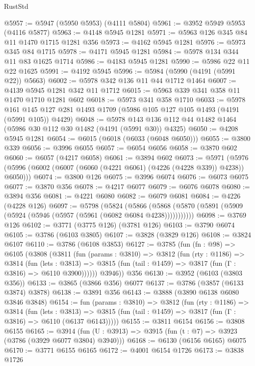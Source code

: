 \begin{lexlean}{RustStd}
\begin{coremodule}
@5957 := @5947 (@5950 @5953) (@4111 @5804)
@5961 := @3952 @5949 @5953 (@4116 @5877)
@5963 := @4148 @5945 @1281
@5971 := @5963 @126 @345 @84 @11 @1470 @1715 @1281 @356
@5973 := @4162 @5945 @1281
@5976 := @5973 @345 @84 @1715
@5978 := @4171 @5945 @1281
@5984 := @5978 @134 @344 @11 @83 @1625 @1714
@5986 := @4183 @5945 @1281
@5990 := @5986 @22 @11 @22 @1625
@5991 := @4192 @5945
@5996 := @5984 (@5990 (@4191 (@5991 @22)) @5663)
@6002 := @5978 @342 @136 @11 @44 @1712 @1464
@6007 := @4139 @5945 @1281 @342 @11 @1712
@6015 := @5963 @339 @341 @358 @11 @1470 @1710 @1281 @602
@6018 := @5973 @341 @358 @1710
@6033 := @5978
    @161
    @145
    @127
    @281
    @1493
    @1709
    (@5986 @105 @127 @105 @1493 (@4191 (@5991 @105)) @4429)
@6048 := @5978 @143 @136 @112 @44 @1482 @1464 (@5986 @30 @112 @30 @1482 (@4191 (@5991 @30)) @4325)
@6050 := @4208 @5945 @1281
@6054 := @6015 (@6018 (@6033 (@6048 @6050)))
@6055 := @3800 @339
@6056 := @3996 @6055
@6057 := @6054 @6056
@6058 := @3870 @602
@6060 := @6057 (@4217 @6058)
@6061 := @3894 @602
@6073 := @5971
    (@5976 (@5996 (@6002 (@6007 (@6060 (@4221 @6061) (@4226 (@4228 @339)) @4238)) @6050)))
@6074 := @3800 @126
@6075 := @3996 @6074
@6076 := @6073 @6075
@6077 := @3870 @356
@6078 := @4217 @6077
@6079 := @6076 @6078
@6080 := @3894 @356
@6081 := @4221 @6080
@6082 := @6079 @6081
@6084 := @4226 (@4228 @126)
@6097 := @5798
    (@5824
      (@5866 (@5868 (@5870 (@5891 (@5909 (@5924 (@5946 (@5957 (@5961 (@6082 @6084 @4238)))))))))))
@6098 := @3769 @126
@6102 := @3771 (@3775 @126) (@3781 @126)
@6103 := @3790 @6074
@6105 := @3786 (@6103 @3805)
@6107 := @3828 (@3829 @126)
@6108 := @3824 @6107
@6110 := @3786 (@6108 @3853)
@6127 := @3785
    (fun (fn : @98) =>
    @6105
      (@3808
        (@3811
          (fun (params : @3810) =>
          @3812
            (fun (rty : @1186) =>
            @3814
              (fun (lets : @3813) =>
              @3815 (fun (tail : @1459) => @3817 (fun (Γ : @3816) => @6110 @3900))))))
        @3946))
    @356
@6130 := @3952 (@6103 (@3803 @356))
@6133 := @3865 (@3866 @356) @6077
@6137 := @3786 (@3857 (@6133 @3874) @3878)
@6138 := @3891 @356
@6143 := @3888 (@3890 @6138 @6080 @3846 @3848)
@6154 := fun (params : @3810) =>
  @3812
    (fun (rty : @1186) =>
    @3814
      (fun (lets : @3813) =>
      @3815 (fun (tail : @1459) => @3817 (fun (Γ : @3816) => @6110 (@6137 @6143)))))
@6155 := @3811 @6154
@6156 := @3808 @6155
@6165 := @3914 (fun (U : @3913) => @3915 (fun (t : @7) => @3923 (@3786 (@3929 @6077 @3804) @3940)))
@6168 := @6130 (@6156 @6165) @6075
@6170 := @3771 @6155 @6165
@6172 := @4001 @6154 @1726
@6173 := @3838 @1726

\end{coremodule}
\end{lexlean}
